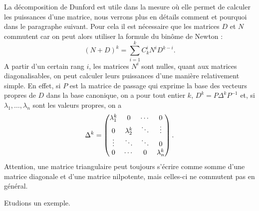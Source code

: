 \documentclass[class=report,crop=false]{standalone}
\begin{document}
La décomposition de Dunford est utile dans la mesure où elle permet de calculer les puissances d'une matrice, nous verrons plus en détails comment et pourquoi dans le paragraphe suivant. Pour cela il est nécessaire que les matrices $D$ et $N$ commutent car on peut alors utiliser la formule du binôme de Newton :
$$(N+D)^k=\sum_{i=1}^kC_k^iN^iD^{k-i}.$$
A partir d'un certain rang $i$, les matrices $N^i$ sont nulles, quant aux matrices diagonalisables, on peut calculer leurs puissances d'une manière relativement simple. En effet, si $P$ est la matrice de passage qui exprime la base des vecteurs propres de $D$ dans la base canonique, on a pour tout entier $k$, $D^k=P\Delta^kP^{-1}$ et, si $\lambda_1,\dots,\lambda_n$ sont les valeurs propres, on a 
$$\Delta^k=\left(\begin{matrix}\lambda_1^k&0&\cdots &0 \cr 0&\lambda_2^k&\ddots &\vdots \cr\vdots &\ddots &\ddots&0\cr0&\cdots&0&\lambda_n^k\end{matrix}\right).$$
Attention, une matrice triangulaire peut toujours s'écrire 
comme somme d'une matrice diagonale et d'une matrice nilpotente, 
mais celles-ci ne commutent pas en général. 

Etudions un exemple. 
\end{document}
